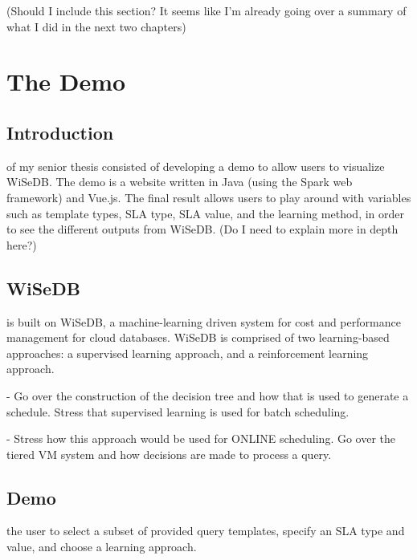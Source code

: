 \documentclass{tufte-book} %
\begin{document}
(Should I include this section? It seems like I'm already going over a summary of what I did in the next two chapters)



\chapter{The Demo}

\section{Introduction}

 of my senior thesis consisted of developing a demo to allow users to visualize WiSeDB. The demo is a website written in Java (using the Spark web framework) and Vue.js. The final result allows users to play around with variables such as template types, SLA type, SLA value, and the learning method, in order to see the different outputs from WiSeDB. (Do I need to explain more in depth here?)

\section{WiSeDB}

 is built on WiSeDB, a machine-learning driven system for cost and performance management for cloud databases. WiSeDB is comprised of two learning-based approaches: a supervised learning approach, and a reinforcement learning approach.

 - Go over the construction of the decision tree and how that is used to generate a schedule. Stress that supervised learning is used for batch scheduling.

 - Stress how this approach would be used for ONLINE scheduling. Go over the tiered VM system and how decisions are made to process a query.

\section{Demo}

 the user to select a subset of provided query templates, specify an SLA type and value, and choose a learning approach. 
\end{document}
